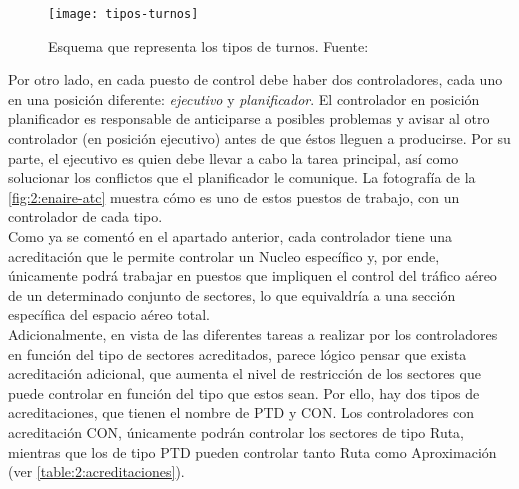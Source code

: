 \begin{figure}
	\centering
	\texttt{[image: tipos-turnos]}
	\caption{Esquema que representa los tipos de turnos. Fuente:~\cite{articulo1}}
	\label{fig:2:tipos-turnos}
\end{figure}

Por otro lado, en cada puesto de control debe haber dos controladores, cada uno en una posición diferente: 
\textit{ejecutivo} y \textit{planificador}. El controlador en posición planificador es responsable de anticiparse a 
posibles problemas y avisar al otro controlador (en posición ejecutivo) antes de que éstos lleguen a producirse. Por su 
parte, el ejecutivo es quien debe llevar a cabo la tarea principal, así como solucionar los conflictos que el 
planificador le comunique. La fotografía de la \autoref{fig:2:enaire-atc} muestra cómo es uno de estos puestos de 
trabajo, con un controlador de cada tipo.
\\

Como ya se comentó en el apartado anterior, cada controlador tiene una acreditación que le permite controlar un 
\gls{Nucleo} específico y, por ende, únicamente podrá trabajar en puestos que impliquen el control del 
tráfico aéreo de un determinado conjunto de sectores, lo que equivaldría a una sección específica del espacio aéreo 
total.
\\

Adicionalmente, en vista de las diferentes tareas a realizar por los controladores en función del tipo de sectores 
acreditados, parece lógico pensar que exista acreditación adicional, que aumenta el nivel de restricción de los 
sectores que puede controlar en función del tipo que estos sean. Por ello, hay dos tipos de acreditaciones, que tienen 
el nombre de PTD y CON. Los controladores con acreditación CON, únicamente podrán controlar los sectores de tipo Ruta, 
mientras que los de tipo PTD pueden controlar tanto Ruta como Aproximación (ver 
\autoref{table:2:acreditaciones}).

